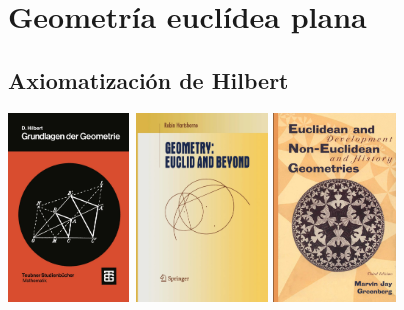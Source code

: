 \documentclass[t, aspectratio=169]{beamer}
\begin{document}
\section{Geometría euclídea plana}


\subsection{Axiomatización de Hilbert}

\begin{frame}[fragile, c]
	\centerline{
		\includegraphics[height=5cm]{./imgs/Hilbert_portada.png}\,
		\pause
		\includegraphics[height=5cm]{./imgs/Hartshorne_portada.png}
		\includegraphics[height=5cm]{./imgs/Greenberg_portada.png}\,
	}
\end{frame}

\end{document}

